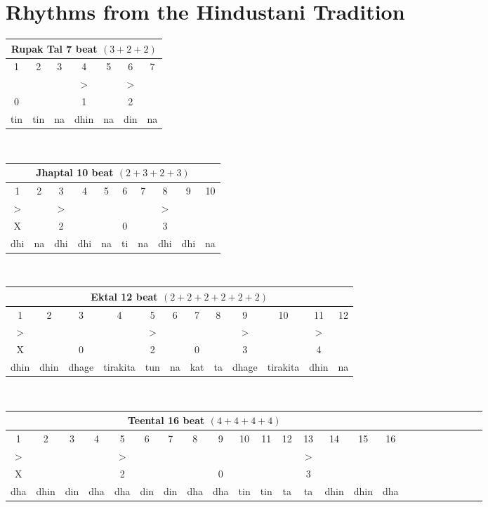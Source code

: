 \documentclass[12pt,a4paper]{article}
\begin{document}
\section{Rhythms from the Hindustani Tradition}
\begin{center}
\begin{tabular}{|ccc|cc|cc|}
    \hline
    \multicolumn{7}{|c|}{Rupak Tal 7 beat \((3+2+2)\)}\\
    \hline
    1&2&3&4&5&6&7\\
    \hline
    &&&\(>\)&&\(>\)&\\
    0&&&1&&2&\\
    \hline
    tin&tin&na&dhin&na&din&na\\
    \hline
\end{tabular}
\end{center}
\\
\begin{center}
\begin{tabular}{|cc|ccc|cc|ccc|}
    \hline
    \multicolumn{10}{|c|}{Jhaptal 10 beat \((2+3+2+3)\)}\\
    \hline
    1&2&3&4&5&6&7&8&9&10\\
    \hline
    \(>\)&&\(>\)&&&&&\(>\)&&\\
    X&&2&&&0&&3&&\\
    \hline
    dhi&na&dhi&dhi&na&ti&na&dhi&dhi&na\\
    \hline
\end{tabular}
\end{center}
\\
\begin{center}
\begin{tabular}{|cc|cc|cc|cc|cc|cc|}
    \hline
    \multicolumn{12}{|c|}{Ektal 12 beat \((2+2+2+2+2+2)\)}\\
    \hline
    1&2&3&4&5&6&7&8&9&10&11&12\\
    \hline
    \(>\)&&&&\(>\)&&&&\(>\)&&\(>\)&\\
    X&&0&&2&&0&&3&&4&\\
    \hline
    dhin&dhin&dhage&tirakita&tun&na&kat&ta&dhage&tirakita&dhin&na\\
    \hline
\end{tabular}
\end{center}
\\
\begin{center}
\begin{tabular}{|cccc|cccc|cccc|cccc|cccc|cccc|}
    \hline
    \multicolumn{16}{|c|}{Teental 16 beat \((4+4+4+4)\)}\\
    \hline
    1&2&3&4&5&6&7&8&9&10&11&12&13&14&15&16\\
    \hline
    \(>\)&&&&\(>\)&&&&&&&&\(>\)&&&\\
    X&&&&2&&&&0&&&&3&&&\\
    \hline
    dha&dhin&din&dha&dha&din&din&dha&dha&tin&tin&ta&ta&dhin&dhin&dha\\
    \hline
\end{tabular}
\end{center}
\\
\end{document}
